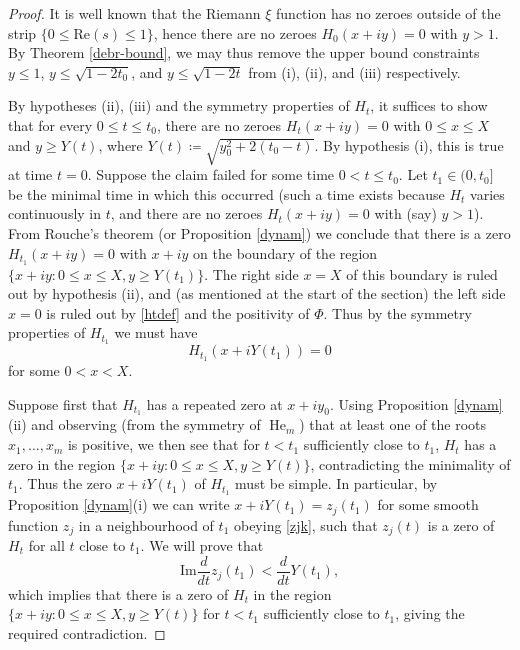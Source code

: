 \documentclass[a4paper,11pt,twoside]{amsart}
\begin{document}
\begin{proof}  It is well known that the Riemann $\xi$ function has no zeroes outside of the strip $\{ 0 \leq \mathrm{Re}(s) \leq 1 \}$, hence there are no zeroes $H_0(x+iy)=0$ with $y > 1$.  By Theorem \ref{debr-bound}, we may thus remove the upper bound constraints $y \leq 1$, $y \leq \sqrt{1-2t_0}$, and $y \leq \sqrt{1-2t}$ from (i), (ii), and (iii) respectively.

By hypotheses (ii), (iii) and the symmetry properties of $H_t$, it suffices to show that for every $0 \leq t \leq t_0$, there are no zeroes $H_t(x+iy) = 0$ with $0 \leq x \leq X$ and $y \geq Y(t)$, where $Y(t) \coloneqq \sqrt{y_0^2 + 2(t_0-t)}$.  By hypothesis (i), this is true at time $t=0$.  Suppose the claim failed for some time $0 < t \leq t_0$.  Let $t_1 \in (0,t_0]$ be the minimal time in which this occurred (such a time exists because $H_t$ varies continuously in $t$, and there are no zeroes $H_t(x+iy)=0$ with (say) $y>1$).  From Rouche's theorem (or Proposition \ref{dynam}) we conclude that there is a zero $H_{t_1}(x+iy)=0$ with $x+iy$ on the boundary of the region $\{ x+iy: 0 \leq	 x \leq X, y \geq Y(t_1) \}$.  The right side $x=X$ of this boundary is ruled out by hypothesis (ii), and (as mentioned at the start of the section) the left side $x=0$ is ruled out by \eqref{htdef} and the positivity of $\Phi$.  Thus by the symmetry properties of $H_{t_1}$ we must have
$$ H_{t_1}(x+iY(t_1)) = 0$$
for some $0 < x < X$.

Suppose first that $H_{t_1}$ has a repeated zero at $x+iy_0$.  Using Proposition \ref{dynam}(ii) and observing (from the symmetry of $\operatorname{He}_m$) that at least one of the roots $x_1,\dots,x_m$ is positive, we then see that for $t<t_1$ sufficiently close to $t_1$, $H_t$ has a zero in the region $\{ x+iy: 0 \leq x \leq X, y \geq Y(t) \}$, contradicting the minimality of $t_1$.  Thus the zero $x+i Y(t_1)$ of $H_{t_1}$ must be simple.  In particular, by Proposition \ref{dynam}(i) we can write $x+i Y(t_1) = z_j(t_1)$ for some smooth function $z_j$ in a neighbourhood of $t_1$ obeying \eqref{zjk}, such that $z_j(t)$ is a zero of $H_t$ for all $t$ close to $t_1$.  We will prove that
\begin{equation}\label{im}
\mathrm{Im} \frac{d}{d t} z_j( t_1 ) < \frac{d}{dt} Y(t_1),
\end{equation}
which implies that there is a zero of $H_t$ in the region $\{ x+iy: 0 \leq x \leq X, y \geq Y(t) \}$  for $t<t_1$ sufficiently close to $t_1$, giving the required contradiction.  


\end{proof}
\end{document}
